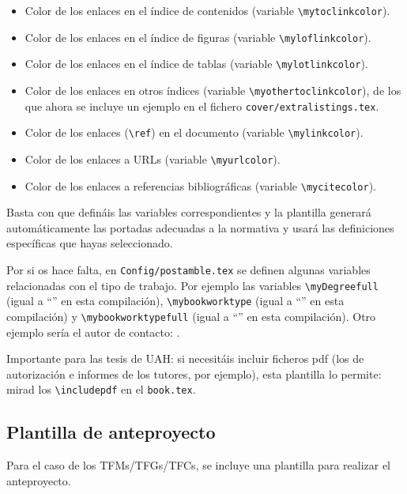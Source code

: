 \begin{itemize}
\item Color de los enlaces en el índice de contenidos (variable
  \texttt{\textbackslash{}mytoclinkcolor}).
\item Color de los enlaces en el índice de figuras (variable
  \texttt{\textbackslash{}myloflinkcolor}).
\item Color de los enlaces en el índice de tablas (variable
  \texttt{\textbackslash{}mylotlinkcolor}).
\item Color de los enlaces en otros índices (variable
  \texttt{\textbackslash{}myothertoclinkcolor}), de los que ahora se
  incluye un ejemplo en el fichero \texttt{cover/extralistings.tex}.
\item Color de los enlaces (\texttt{\textbackslash{}ref}) en el
  documento (variable \texttt{\textbackslash{}mylinkcolor}).
\item Color de los enlaces a URLs (variable
  \texttt{\textbackslash{}myurlcolor}).
\item Color de los enlaces a referencias bibliográficas (variable
  \texttt{\textbackslash{}mycitecolor}).
\end{itemize}

Basta con que defináis las variables correspondientes y la plantilla
generará automáticamente las portadas adecuadas a la normativa y usará
las definiciones específicas que hayas seleccionado.

Por si os hace falta, en \texttt{Config/postamble.tex} se definen
algunas variables relacionadas con el tipo de trabajo. Por ejemplo las
variables \texttt{\textbackslash{}myDegreefull} (igual a
``\myDegreefull'' en esta compilación),
\texttt{\textbackslash{}mybookworktype} (igual a ``\mybookworktype'' en
esta compilación) y \texttt{\textbackslash{}mybookworktypefull} (igual a
``\mybookworktypefull'' en esta compilación). Otro ejemplo sería el
autor de contacto: \contactauthor.

Importante para las tesis de UAH: si necesitáis incluir ficheros pdf
(los de autorización e informes de los tutores, por ejemplo), esta
plantilla lo permite: mirad los \texttt{\textbackslash{}includepdf} en
el \texttt{book.tex}.

\subsection{Plantilla de anteproyecto}
\label{sec:plantilla-de-anteproyecto}

Para el caso de los TFMs/TFGs/TFCs, se incluye una plantilla para
realizar el anteproyecto.

